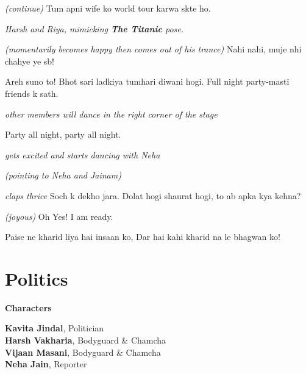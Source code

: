 \documentclass[12pt,a4paper,oneside]{memoir}
\begin{document}
\begin{description}[itemsep=1ex,leftmargin=1cm]
\item[BHARGAV] \textit{(continue)} Tum apni wife ko world tour karwa skte ho.

\textit{Harsh and Riya, mimicking \textbf{The Titanic} pose. }

\item[JAINAM] \textit{(momentarily becomes happy then comes out of his trance)} Nahi nahi, muje nhi chahye ye sb!

\item[BHARGAV] Areh suno to! Bhot sari ladkiya tumhari diwani hogi. Full night party-masti friends k sath.

\textit{other members will dance in the right corner of the stage}

\item[OTHERS] Party all night, party all night.

\item[JAINAM] \textit{gets excited and starts dancing with Neha}

\item[OTHERS] \textit{(pointing to Neha and Jainam)}

\item[BHARGAV] \textit{claps thrice} Soch k dekho jara. Dolat hogi shaurat hogi, to ab apka kya kehna?

\item[JAINAM] \textit{(joyous)} Oh Yes! I am ready.

\item[NEHA] Paise ne kharid liya hai insaan ko, Dar hai kahi kharid na le bhagwan ko!

\end{description}

\vskip 1cm


\chapter*{Politics}

\begin{center}

\textbf{Characters}

\vskip 1cm

\textbf{Kavita Jindal}, Politician \\
\textbf{Harsh Vakharia}, Bodyguard \& Chamcha \\
\textbf{Vijaan Masani}, Bodyguard \& Chamcha \\
\textbf{Neha Jain}, Reporter \\
\vskip 1cm
\end{center}
\end{document}
